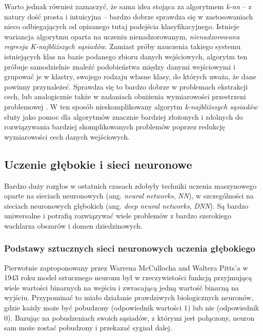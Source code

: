 \begin{itemize}
        Warto jednak również zaznaczyć, że sama idea stojąca za algorytmem \emph{k-nn} -- z natury dość prosta i intuicyjna -- bardzo dobrze sprawdza się w zastosowaniach nieco odbiegających od opisanego tutaj podejścia klasyfikacyjnego.
        Istnieje wariancja algorytmu oparta na uczeniu nienadzorowanym, \emph{nienadzorowana regresja K-najbliższych sąsiadów}.
        Zamiast próby nauczenia takiego systemu istniejących klas na bazie podanego zbioru danych wejściowych, algorytm ten próbuje samodzielnie znaleźć podobieństwa między danymi wejściowymi i grupować je w klastry, swojego rodzaju własne klasy, do których uważa, że dane powinny przynależeć.
        Sprawdza się to bardzo dobrze w problemach ekstrakcji cech, lub analogicznie także w zadaniach obniżenia wymiarowości przestrzeni problemowej \cite{wang2015accelerating}.
        W ten sposób nieskomplikowany algorytm \emph{k-najbliższych sąsiadów} służy jako pomoc dla algorytmów znacznie bardziej złożonych i zdolnych do rozwiązywania bardziej skomplikowanych problemów poprzez redukcję wymiarowości cech danych wejściowych.

\end{itemize}

\subsection{Uczenie głębokie i sieci neuronowe}

Bardzo duży rozgłos w ostatnich czasach zdobyły techniki uczenia maszynowego oparte na sieciach neuronowych (ang. \emph{neural networks}, \emph{NN}), w szczególności na sieciach neuronowych głębokich (ang. \emph{deep neural networks}, \emph{DNN}).
Są bardzo uniwersalne i potrafią rozwiązywać wiele problemów z bardzo szerokiego wachlarza obszarów i domen dziedzinowych.

\subsubsection{Podstawy sztucznych sieci neuronowych uczenia głębokiego}

Pierwotnie zaproponowany przez Warrena McCullocha and Waltera Pitts'a w 1943 roku \cite{mcculloch1943logical} model sztucznego neuronu był w rzeczywistości funkcją przyjmującą wiele wartości binarnych na wejściu i zwracającą jedną wartość binarną na wyjściu.
Przypominać to miało działanie prawdziwych biologicznych neuronów, gdzie każdy może być pobudzony (odpowiednik wartości $1$) lub nie (odpowiednik $0$).
Bazując na pobudzeniach swoich sąsiadów, z którymi jest połączony, neuron sam może zostać pobudzony i przekazać sygnał dalej.

